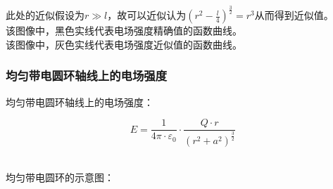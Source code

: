 \documentclass[UTF8]{ctexart}
\begin{document}
    此处的近似假设为$r\gg l$，故可以近似认为$\left(r^2-\frac{l}{4}\right)^{\frac{3}{2}}=r^3$从而得到近似值。\\[3mm]
    该图像中，黑色实线代表电场强度精确值的函数曲线。\\[3mm]
    该图像中，灰色实线代表电场强度近似值的函数曲线。

\newpage

\subsubsection{均匀带电圆环轴线上的电场强度}
    \setcounter{equation}{0}
    均匀带电圆环轴线上的电场强度：
    \begin{large}
        \begin{equation*}
            E=\frac{1}{4\pi\cdot\varepsilon_0}\cdot\frac{Q\cdot r}{\left(r^2+a^2\right)^{\frac{3}{2}}}
        \end{equation*}
    \end{large}\\
    均匀带电圆环的示意图：
\end{document}
